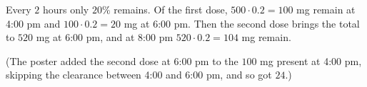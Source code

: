 Every $2$ hours only $20\%$ remains. Of the first dose, $500\cdot0.2=100$ mg remain at 4:00 pm and $100\cdot0.2=20$ mg at 6:00 pm. Then the second dose brings the total to $520$ mg at 6:00 pm, and at 8:00 pm $520\cdot0.2=\boxed{104}$ mg remain.

(The poster added the second dose at 6:00 pm to the $100$ mg present at 4:00 pm, skipping the clearance between 4:00 and 6:00 pm, and so got $24$.)
